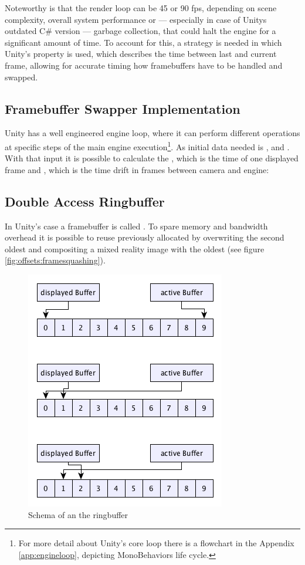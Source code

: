 Noteworthy is that the render loop can be 45 or 90 fps, depending on scene 
complexity, overall system performance or --- especially in case of Unitys 
outdated C\# version --- garbage collection, that could halt the engine for a 
significant amount of time. To account for this, a strategy is needed in which 
Unity's  property is used, which describes the time 
between last and current frame, allowing for accurate timing how framebuffers 
have to be handled and swapped.

\subsection{Framebuffer Swapper Implementation}

Unity has a well engineered engine loop, where it can perform different 
operations at specific steps of the main engine execution\footnote{For more 
detail about Unity's core loop there is a flowchart in the Appendix 
\ref{app:engineloop}, depicting MonoBehaviors life cycle.}. As 
initial data needed is ,  and 
. With that input it is possible to calculate the 
, which is the time of one displayed frame and 
, which is the time drift in frames between camera and engine:



\subsection{Double Access Ringbuffer}

In Unity's case a framebuffer is called . To spare 
memory and bandwidth overhead it is possible to reuse previously allocated 
 by overwriting the second oldest  and 
compositing a mixed reality image with the oldest (see  
figure \ref{fig:offsets:framesquashing}).

\begin{figure}[ht]
	\centering
	\includegraphics[width=.5\textwidth]{gfx/ringbuffer_schematics.png}
	\caption{Schema of an the ringbuffer}
	\label{fig:offsets:ringbuffer}
\end{figure}

